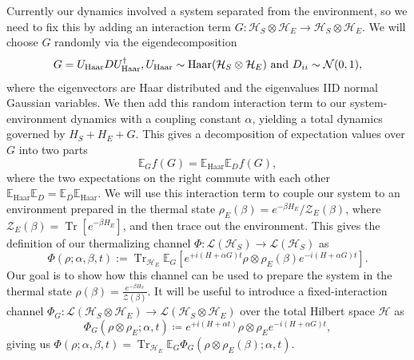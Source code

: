 \documentclass{article}
\newcommand{\haar}{\text{Haar}}
\newcommand{\brackets}[1]{\left[ #1 \right]}
\DeclareMathOperator{\Tr}{Tr}
\newcommand{\trace}[1]{\Tr \brackets{ #1 }}
\newcommand{\hilb}{\mathcal{H}}
\newcommand{\partfun}{\mathcal{Z}}
\begin{document}
Currently our dynamics involved a system separated from the environment, so we need to fix this by adding an interaction term $G : \hilb_S \otimes \hilb_E \to \hilb_S \otimes \hilb_E$. We will choose $G$ randomly via the eigendecomposition 
\begin{equation}
    G = U_{\haar} D U_{\haar}^\dagger, U_{\haar} \sim {\rm Haar}(\hilb_S \otimes \hilb_E) \text{ and } D_{ii} \sim \mathcal{N}(0,1), \label{eq:interaction_def}
\end{equation}
where the eigenvectors are Haar distributed and the eigenvalues IID normal Gaussian variables. We then add this random interaction term to our system-environment dynamics with a coupling constant $\alpha$, yielding a total dynamics governed by $H_S + H_E + G$. This gives a decomposition of expectation values over $G$ into two parts 
\begin{equation}
    \mathbb{E}_G f(G) = \mathbb{E}_{\haar} \mathbb{E}_{D} f(G),
\end{equation}
where the two expectations on the right commute with each other $\mathbb{E}_{\haar} \mathbb{E}_{D} = \mathbb{E}_{D} \mathbb{E}_{\haar} $. We will use this interaction term to couple our system to an environment prepared in the thermal state $\rho_E(\beta) = e^{-\beta H_E} /\partfun_E(\beta)$, where $\partfun_E(\beta) = \trace{e^{-\beta H_E}}$, and then trace out the environment. This gives the definition of our thermalizing channel $\Phi : \mathcal{L}(\hilb_S) \to \mathcal{L}(\hilb_S)$ as
\begin{equation}\label{eq:PhiDef}
    \Phi(\rho ; \alpha, \beta, t) :=  \Tr_{\hilb_E} \mathbb{E}_{G} \left[ e^{+i(H + \alpha G)t} \rho \otimes \rho_E(\beta) e^{-i(H + \alpha G) t}\right].
\end{equation}
Our goal is to show how this channel can be used to prepare the system in the thermal state $\rho(\beta) = \frac{e^{-\beta H_S}}{\partfun(\beta)}$. It will be useful to introduce a fixed-interaction channel $\Phi_G : \mathcal{L}(\hilb_S \otimes \hilb_E) \to \mathcal{L}(\hilb_S \otimes \hilb_E)$ over the total Hilbert space $\hilb$ as 
\begin{equation}
    \Phi_G(\rho \otimes \rho_E; \alpha, t) \coloneqq e^{+i(H + \alpha t)} \rho \otimes \rho_E e^{- i(H + \alpha G)t}, \label{eq:phi_g_definition}
\end{equation}
giving us $\Phi(\rho; \alpha, \beta, t) = \Tr_{\hilb_E} \mathbb{E}_G \Phi_G(\rho \otimes \rho_E(\beta); \alpha, t)$. 
\end{document}

